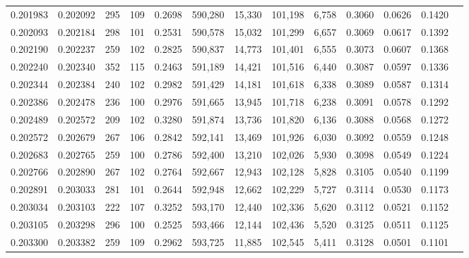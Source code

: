 \begin{tabular}{rrrrrrrrrrrrr}
0.201983 & 0.202092 &   295 & 109 &                                     0.2698 & 590,280 &  15,330 & 101,198 &   6,758 & 0.3060 & 0.0626 & 0.1420 \\
0.202093 & 0.202184 &   298 & 101 &                                     0.2531 & 590,578 &  15,032 & 101,299 &   6,657 & 0.3069 & 0.0617 & 0.1392 \\
0.202190 & 0.202237 &   259 & 102 &                                     0.2825 & 590,837 &  14,773 & 101,401 &   6,555 & 0.3073 & 0.0607 & 0.1368 \\
0.202240 & 0.202340 &   352 & 115 &                                     0.2463 & 591,189 &  14,421 & 101,516 &   6,440 & 0.3087 & 0.0597 & 0.1336 \\
0.202344 & 0.202384 &   240 & 102 &                                     0.2982 & 591,429 &  14,181 & 101,618 &   6,338 & 0.3089 & 0.0587 & 0.1314 \\
0.202386 & 0.202478 &   236 & 100 &                                     0.2976 & 591,665 &  13,945 & 101,718 &   6,238 & 0.3091 & 0.0578 & 0.1292 \\
0.202489 & 0.202572 &   209 & 102 &                                     0.3280 & 591,874 &  13,736 & 101,820 &   6,136 & 0.3088 & 0.0568 & 0.1272 \\
0.202572 & 0.202679 &   267 & 106 &                                     0.2842 & 592,141 &  13,469 & 101,926 &   6,030 & 0.3092 & 0.0559 & 0.1248 \\
0.202683 & 0.202765 &   259 & 100 &                                     0.2786 & 592,400 &  13,210 & 102,026 &   5,930 & 0.3098 & 0.0549 & 0.1224 \\
0.202766 & 0.202890 &   267 & 102 &                                     0.2764 & 592,667 &  12,943 & 102,128 &   5,828 & 0.3105 & 0.0540 & 0.1199 \\
0.202891 & 0.203033 &   281 & 101 &                                     0.2644 & 592,948 &  12,662 & 102,229 &   5,727 & 0.3114 & 0.0530 & 0.1173 \\
0.203034 & 0.203103 &   222 & 107 &                                     0.3252 & 593,170 &  12,440 & 102,336 &   5,620 & 0.3112 & 0.0521 & 0.1152 \\
0.203105 & 0.203298 &   296 & 100 &                                     0.2525 & 593,466 &  12,144 & 102,436 &   5,520 & 0.3125 & 0.0511 & 0.1125 \\
0.203300 & 0.203382 &   259 & 109 &                                     0.2962 & 593,725 &  11,885 & 102,545 &   5,411 & 0.3128 & 0.0501 & 0.1101 \\

\end{tabular}
